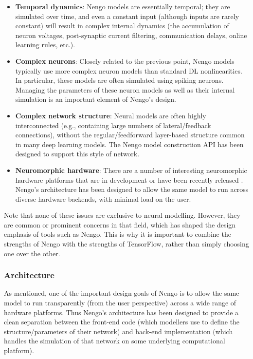 \documentclass{article}
\begin{document}
\begin{itemize}
\item {\bf Temporal dynamics}: Nengo models are essentially temporal; they are simulated over time, and even a constant input (although inputs are rarely constant) will result in complex internal dynamics (the accumulation of neuron voltages, post-synaptic current filtering, communication delays, online learning rules, etc.).
\item {\bf Complex neurons}: Closely related to the previous point, Nengo models typically use more complex neuron models than standard DL nonlinearities. In particular, these models are often simulated using spiking neurons.  Managing the parameters of these neuron models as well as their internal simulation is an important element of Nengo's design.
\item {\bf Complex network structure}: Neural models are often highly interconnected (e.g., containing large numbers of lateral/feedback connections), without the regular/feedforward layer-based structure common in many deep learning models.  The Nengo model construction API has been designed to support this style of network.
\item {\bf Neuromorphic hardware}: There are a number of interesting neuromorphic hardware platforms that are in development or have been recently released \citep{needcitation}.  Nengo's architecture has been designed to allow the same model to run across diverse hardware backends, with minimal load on the user.
\end{itemize}

Note that none of these issues are exclusive to neural modelling.  However, they are common or prominent concerns in that field, which has shaped the design emphasis of tools such as Nengo.  This is why it is important to combine the strengths of Nengo with the strengths of TensorFlow, rather than simply choosing one over the other.

\subsubsection{Architecture}

As mentioned, one of the important design goals of Nengo is to allow the same model to run transparently (from the user perspective) across a wide range of hardware platforms.  Thus Nengo's architecture has been designed to provide a clean separation between the front-end code (which modellers use to define the structure/parameters of their network) and back-end implementation (which handles the simulation of that network on some underlying computational platform).  
\end{document}
